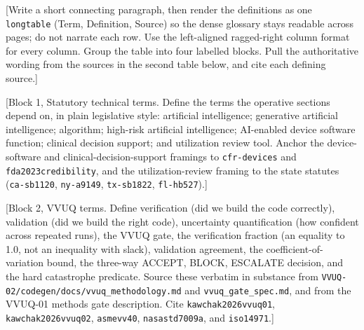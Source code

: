 
[Write a short connecting paragraph, then render the definitions as one
\texttt{longtable} (Term, Definition, Source) so the dense glossary stays
readable across pages; do not narrate each row. Use the left-aligned ragged-right
column format for every column. Group the table into four labelled blocks. Pull
the authoritative wording from the sources in the second table below, and cite
each defining source.]

[Block 1, Statutory technical terms. Define the terms the operative sections
depend on, in plain legislative style: artificial intelligence; generative
artificial intelligence; algorithm; high-risk artificial intelligence;
AI-enabled device software function; clinical decision support; and utilization
review tool. Anchor the device-software and clinical-decision-support framings to
\texttt{cfr-devices} and \texttt{fda2023credibility}, and the utilization-review
framing to the state statutes (\texttt{ca-sb1120}, \texttt{ny-a9149},
\texttt{tx-sb1822}, \texttt{fl-hb527}).]

[Block 2, VVUQ terms. Define verification (did we build the code correctly),
validation (did we build the right code), uncertainty quantification (how
confident across repeated runs), the VVUQ gate, the verification fraction (an
equality to 1.0, not an inequality with slack), validation agreement, the
coefficient-of-variation bound, the three-way ACCEPT, BLOCK, ESCALATE decision,
and the hard catastrophe predicate. Source these verbatim in substance from
\texttt{VVUQ-02/codegen/docs/vvuq\_methodology.md} and
\texttt{vvuq\_gate\_spec.md}, and from the VVUQ-01 methods gate description. Cite
\texttt{kawchak2026vvuq01}, \texttt{kawchak2026vvuq02}, \texttt{asmevv40},
\texttt{nasastd7009a}, and \texttt{iso14971}.]

